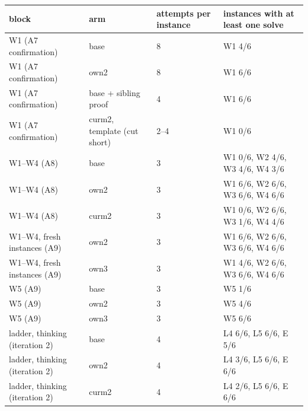 \begin{tabular}{llll}
\toprule
block & arm & attempts per instance & instances with at least one solve \\
\midrule
W1 (A7 confirmation) & base & 8 & W1 4/6 \\
W1 (A7 confirmation) & own2 & 8 & W1 6/6 \\
W1 (A7 confirmation) & base + sibling proof & 4 & W1 6/6 \\
W1 (A7 confirmation) & curm2, template (cut short) & 2--4 & W1 0/6 \\
\midrule
W1--W4 (A8) & base & 3 & W1 0/6, W2 4/6, W3 4/6, W4 3/6 \\
W1--W4 (A8) & own2 & 3 & W1 6/6, W2 6/6, W3 6/6, W4 6/6 \\
W1--W4 (A8) & curm2 & 3 & W1 0/6, W2 6/6, W3 1/6, W4 4/6 \\
\midrule
W1--W4, fresh instances (A9) & own2 & 3 & W1 6/6, W2 6/6, W3 6/6, W4 6/6 \\
W1--W4, fresh instances (A9) & own3 & 3 & W1 4/6, W2 6/6, W3 6/6, W4 6/6 \\
\midrule
W5 (A9) & base & 3 & W5 1/6 \\
W5 (A9) & own2 & 3 & W5 4/6 \\
W5 (A9) & own3 & 3 & W5 6/6 \\
\midrule
ladder, thinking (iteration 2) & base & 4 & L4 6/6, L5 6/6, E 5/6 \\
ladder, thinking (iteration 2) & own2 & 4 & L4 3/6, L5 6/6, E 6/6 \\
ladder, thinking (iteration 2) & curm2 & 4 & L4 2/6, L5 6/6, E 6/6 \\
\bottomrule
\end{tabular}
